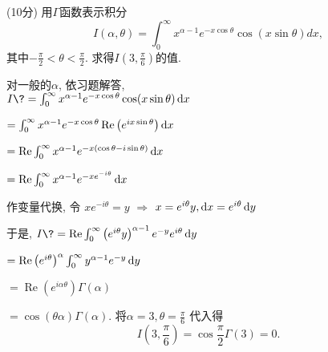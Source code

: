 \documentclass{njustexam}
\begin{document}





\begin{problem}{(10分)}
  用$\Gamma$函数表示积分
  $$
  I(\alpha, \theta) = \int_0^\infty x^{ \alpha - 1}  e^{-x \cos{\theta}} \cos\left( x \sin{\theta} \right) dx, 
  $$
  其中$ -\frac{\pi}{2} < \theta < \frac{\pi}{2}$. 
  求得$I(3, \frac{\pi}{6})$的值.
  \end{problem}  
  \vfill
  \begin{solution}
  对一般的$\alpha$, 依习题解答,\\
  $I\?=\int_0^{\infty} x^{\alpha-1} e^{-x \cos \theta} \cos (x \sin \theta) \dx$ \par
  \+ $=\int_0^{\infty} x^{\alpha-1} e^{-x \cos \theta} \operatorname{Re}\left(e^{i x \sin \theta}\right) \mathop{}\!\mathrm{d} x $ \par
  \+ $=\operatorname{Re} \int_0^{\infty} x^{\alpha-1} e^{-x(\cos \theta-i \sin \theta)} \mathop{}\!\mathrm{d} x$ \par
  \+ $=\operatorname{Re} \int_0^{\infty} x^{\alpha-1} e^{-x e^{-i \theta}} \mathop{}\!\mathrm{d} x$ \par
  作变量代换, 令 $x e^{-i \theta}=y$ $\Rightarrow$ $x=e^{i \theta} y,  \mathop{}\!\mathrm{d} x=e^{i \theta} \mathop{}\!\mathrm{d} y$ \par
  于是,  $I \?=\operatorname{Re} \int_0^{\infty}\left(e^{i \theta} y\right)^{\alpha-1} e^{-y} e^{i \theta} \dy $ \par
  \+ $ =\operatorname{Re}\left(e^{i \theta}\right)^\alpha \int_0^{\infty} y^{\alpha-1} e^{-y} \mathop{}\!\mathrm{d} y $ \par
  \+ $ =\operatorname{Re}\left(e^{i \alpha \theta}\right) \Gamma(\alpha)$ \par
  \+ $ = \cos {(\theta \alpha)} \Gamma(\alpha).  $ 
  将$\alpha = 3, \theta = \frac{\pi}{6} $ 代入得
  $$I(3, \frac{\pi}{6})=  \cos{ \frac{\pi}{2}}  \Gamma(3) = 0. $$
  \end{solution}
\end{document}
